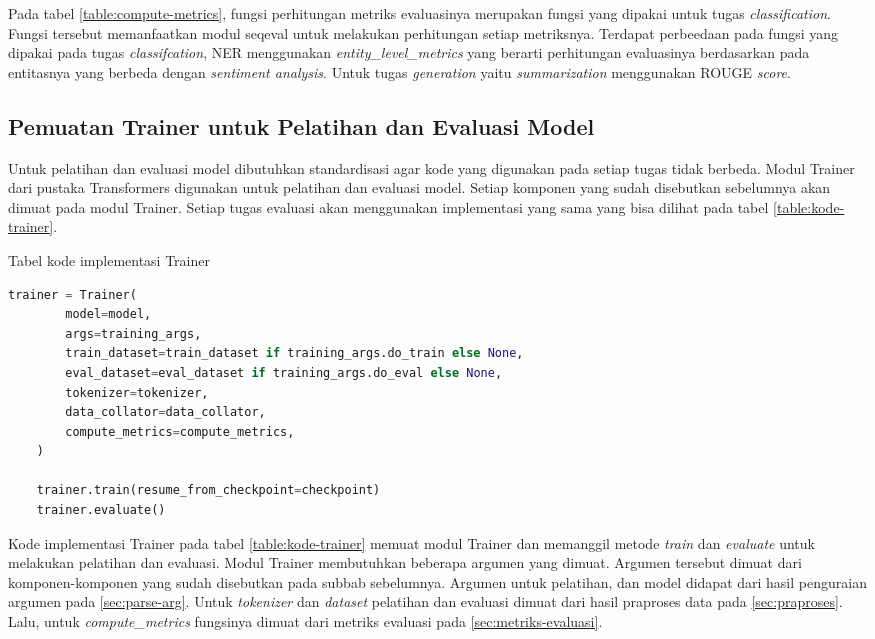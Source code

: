 Pada tabel \ref{table:compute-metrics}, fungsi perhitungan metriks evaluasinya merupakan fungsi yang dipakai untuk tugas \textit{classification}. Fungsi tersebut memanfaatkan modul seqeval untuk melakukan perhitungan setiap metriksnya. Terdapat perbeedaan pada fungsi yang dipakai pada tugas \textit{classifcation}, NER menggunakan \textit{entity\_level\_metrics} yang berarti perhitungan evaluasinya berdasarkan pada entitasnya yang berbeda dengan \textit{sentiment analysis}. Untuk tugas \textit{generation} yaitu \textit{summarization} menggunakan ROUGE \textit{score}.

\subsection{Pemuatan Trainer untuk Pelatihan dan Evaluasi Model}

Untuk pelatihan dan evaluasi model dibutuhkan standardisasi agar kode yang digunakan pada setiap tugas tidak berbeda. Modul Trainer dari pustaka Transformers digunakan untuk pelatihan dan evaluasi model. Setiap komponen yang sudah disebutkan sebelumnya akan dimuat pada modul Trainer. Setiap tugas evaluasi akan menggunakan implementasi yang sama yang bisa dilihat pada tabel \ref{table:kode-trainer}.

\begin{table}[h]
    \caption{Tabel kode implementasi Trainer}
    \label{table:kode-trainer}
    \begin{lstlisting}[language=python]
    trainer = Trainer(
        model=model,
        args=training_args,
        train_dataset=train_dataset if training_args.do_train else None,
        eval_dataset=eval_dataset if training_args.do_eval else None,
        tokenizer=tokenizer,
        data_collator=data_collator,
        compute_metrics=compute_metrics,
    )

    trainer.train(resume_from_checkpoint=checkpoint)
    trainer.evaluate()
    \end{lstlisting}
\end{table}

Kode implementasi Trainer pada tabel \ref{table:kode-trainer} memuat modul Trainer dan memanggil metode \textit{train} dan \textit{evaluate} untuk melakukan pelatihan dan evaluasi. Modul Trainer membutuhkan beberapa argumen yang dimuat. Argumen tersebut dimuat dari komponen-komponen yang sudah disebutkan pada subbab sebelumnya. Argumen untuk pelatihan, dan model didapat dari hasil penguraian argumen pada \ref{sec:parse-arg}. Untuk \textit{tokenizer} dan \textit{dataset} pelatihan dan evaluasi dimuat dari hasil praproses data pada \ref{sec:praproses}. Lalu, untuk \textit{compute\_metrics} fungsinya dimuat dari metriks evaluasi pada \ref{sec:metriks-evaluasi}. 
